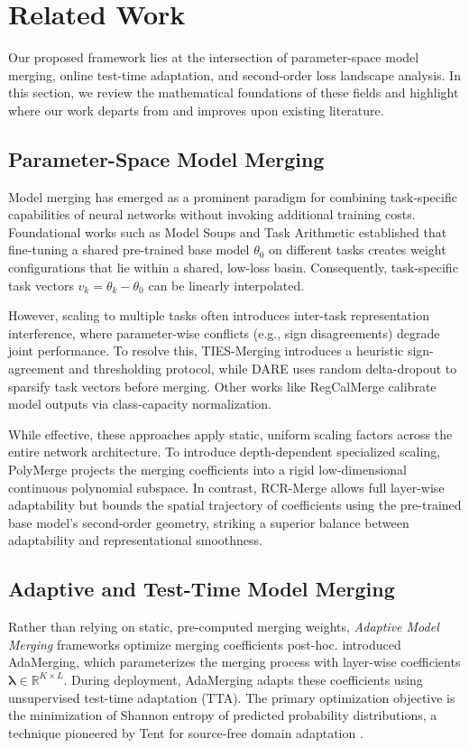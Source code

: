 \section{Related Work}
\label{sec:related_work}

Our proposed framework lies at the intersection of parameter-space model merging, online test-time adaptation, and second-order loss landscape analysis. In this section, we review the mathematical foundations of these fields and highlight where our work departs from and improves upon existing literature.

\subsection{Parameter-Space Model Merging}
Model merging has emerged as a prominent paradigm for combining task-specific capabilities of neural networks without invoking additional training costs. Foundational works such as Model Soups \citep{wortsman2022model} and Task Arithmetic \citep{ilharco2022editing} established that fine-tuning a shared pre-trained base model $\theta_0$ on different tasks creates weight configurations that lie within a shared, low-loss basin. Consequently, task-specific task vectors $v_k = \theta_k - \theta_0$ can be linearly interpolated. 

However, scaling to multiple tasks often introduces inter-task representation interference, where parameter-wise conflicts (e.g., sign disagreements) degrade joint performance. To resolve this, TIES-Merging \citep{yadav2023ties} introduces a heuristic sign-agreement and thresholding protocol, while DARE \citep{yu2023language} uses random delta-dropout to sparsify task vectors before merging. Other works like RegCalMerge \citep{regcalmerge} calibrate model outputs via class-capacity normalization. 

While effective, these approaches apply static, uniform scaling factors across the entire network architecture. To introduce depth-dependent specialized scaling, PolyMerge \citep{polymerge} projects the merging coefficients into a rigid low-dimensional continuous polynomial subspace. In contrast, RCR-Merge allows full layer-wise adaptability but bounds the spatial trajectory of coefficients using the pre-trained base model's second-order geometry, striking a superior balance between adaptability and representational smoothness.

\subsection{Adaptive and Test-Time Model Merging}
Rather than relying on static, pre-computed merging weights, \emph{Adaptive Model Merging} frameworks optimize merging coefficients post-hoc. \citet{adamerging} introduced AdaMerging, which parameterizes the merging process with layer-wise coefficients $\boldsymbol{\lambda} \in \mathbb{R}^{K \times L}$. During deployment, AdaMerging adapts these coefficients using unsupervised test-time adaptation (TTA). The primary optimization objective is the minimization of Shannon entropy of predicted probability distributions, a technique pioneered by Tent \citep{wang2020tent} for source-free domain adaptation \citep{liang2023source}.

